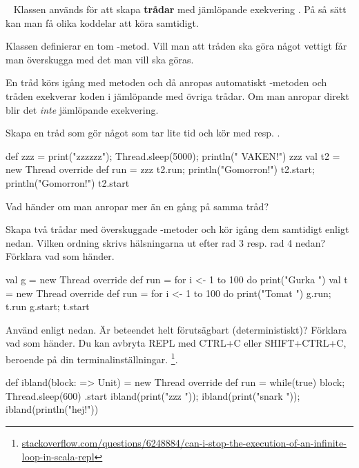 
\QUESTBEGIN

\Task  \what~   Klassen  används för att skapa  \textbf{trådar} med jämlöpande exekvering . På så sätt kan man få olika koddelar att köra samtidigt.

Klassen  definierar en tom -metod. Vill man att tråden ska göra något vettigt får man överskugga  med det man vill ska göras.

En tråd körs igång med metoden  och då anropas automatiskt -metoden och tråden exekverar koden i  jämlöpande med övriga trådar. Om man anropar  direkt blir det \emph{inte} jämlöpande exekvering.

\Subtask Skapa en tråd som gör något som tar lite tid och kör med  resp. .
\begin{REPL}
def zzz = { print("zzzzzz"); Thread.sleep(5000); println(" VAKEN!")}
zzz
val t2 = new Thread{ override def run = zzz }
t2.run; println("Gomorron!")
t2.start; println("Gomorron!")
t2.start
\end{REPL}

\Subtask Vad händer om man anropar  mer än en gång på samma tråd?

\Subtask Skapa två trådar med överskuggade -metoder och kör igång dem samtidigt enligt nedan. Vilken ordning skrivs hälsningarna ut efter rad 3 resp. rad 4 nedan? Förklara vad som händer.
\begin{REPL}
val g = new Thread{ override def run = for i <- 1 to 100 do print("Gurka ") }
val t = new Thread{ override def run = for i <- 1 to 100 do print("Tomat ") }
g.run; t.run
g.start; t.start
\end{REPL}

\Subtask Använd  enligt nedan. Är beteendet helt förutsägbart (deterministiskt)? Förklara vad som händer. Du kan avbryta REPL med CTRL+C eller SHIFT+CTRL+C, beroende på din terminalinställningar.%
\footnote{\href{http://stackoverflow.com/questions/6248884/can-i-stop-the-execution-of-an-infinite-loop-in-scala-repl}{stackoverflow.com/questions/6248884/can-i-stop-the-execution-of-an-infinite-loop-in-scala-repl}}.
\begin{REPL}
def ibland(block: => Unit) = new Thread {
  override def run = while(true) { block; Thread.sleep(600) }
}.start
ibland(print("zzz ")); ibland(print("snark ")); ibland(println("hej!"))
\end{REPL}


